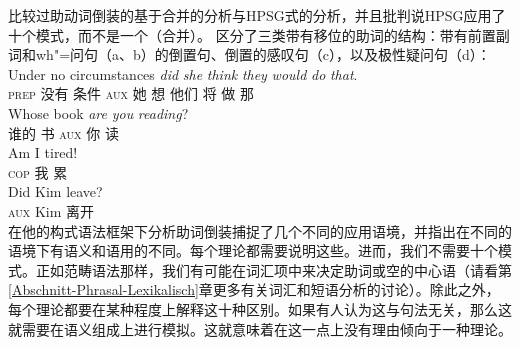  \citet{Chomsky2010a}比较过助动词倒装的基于合并的分析与HPSG式的分析，并且批判说HPSG应用了十个模式，而不是一个（合并）。 \citet{GSag2000a-u}区分了三类带有移位的助词的结构：带有前置副词和wh"=问句（a、b）的倒置句、倒置的感叹句（c），以及极性疑问句（d）：
\eal
\ex 
\gll Under no circumstances \emph{did} \emph{she} \emph{think} \emph{they} \emph{would} \emph{do} \emph{that}.\\
     \textsc{prep} 没有 条件 \textsc{aux} 她 想 他们 将 做 那\\
\ex 
\gll Whose book \emph{are} \emph{you} \emph{reading}?\\
谁的 书 \textsc{aux} 你 读\\
\ex 
\gll Am I tired!\\
\textsc{cop} 我 累\\
\ex 
\gll Did Kim leave?\\
\textsc{aux} Kim 离开\\
\zl
 \citet{Fillmore99a}在他的构式语法框架下分析助词倒装捕捉了几个不同的应用语境，并指出在不同的语境下有语义和语用的不同。每个理论都需要说明这些。进而，我们不需要十个模式。正如范畴语法那样，我们有可能在词汇项中来决定助词或空的中心语（请看第\ref{Abschnitt-Phrasal-Lexikalisch}章更多有关词汇和短语分析的讨论）。除此之外，每个理论都要在某种程度上解释这十种区别。如果有人认为这与句法无关，那么这就需要在语义组成上进行模拟。这就意味着在这一点上没有理由倾向于一种理论。


